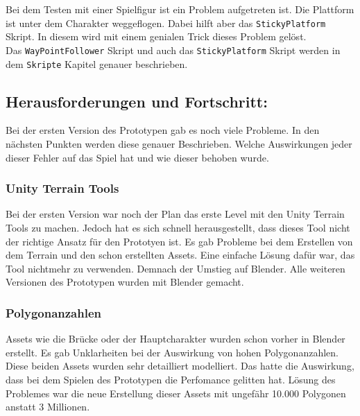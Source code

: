 Bei dem Testen mit einer Spielfigur ist ein Problem aufgetreten ist. Die Plattform ist unter dem Charakter weggeflogen. Dabei hilft aber das \verb+StickyPlatform+ Skript. In diesem wird mit einem genialen Trick dieses Problem gelöst.\\

Das \verb+WayPointFollower+ Skript und auch das \verb+StickyPlatform+ Skript werden in dem \verb+Skripte+ Kapitel genauer beschrieben. 

\pagebreak


\subsection{Herausforderungen und Fortschritt:}

Bei der ersten Version des Prototypen gab es noch viele Probleme. In den nächsten Punkten werden diese genauer Beschrieben. Welche Auswirkungen jeder dieser Fehler auf das Spiel hat und wie dieser behoben wurde.

\subsubsection{Unity Terrain Tools}
Bei der ersten Version war noch der Plan das erste Level mit den Unity Terrain Tools zu machen. Jedoch hat es sich schnell herausgestellt, dass dieses Tool nicht der richtige Ansatz für den Prototyen ist. Es gab Probleme bei dem Erstellen von dem Terrain und den schon erstellten Assets. Eine einfache Lösung dafür war, das Tool nichtmehr zu verwenden. Demnach der Umstieg auf Blender. Alle weiteren Versionen des Prototypen wurden mit Blender gemacht.

\subsubsection{Polygonanzahlen}
Assets wie die Brücke oder der Hauptcharakter wurden schon vorher in Blender erstellt. Es gab Unklarheiten bei der Auswirkung von hohen Polygonanzahlen. Diese beiden Assets wurden sehr detailliert modelliert. Das hatte die Auswirkung, dass bei dem Spielen des Prototypen die Perfomance gelitten hat. Lösung des Problemes war die neue Erstellung dieser Assets mit ungefähr 10.000 Polygonen anstatt 3 Millionen.

